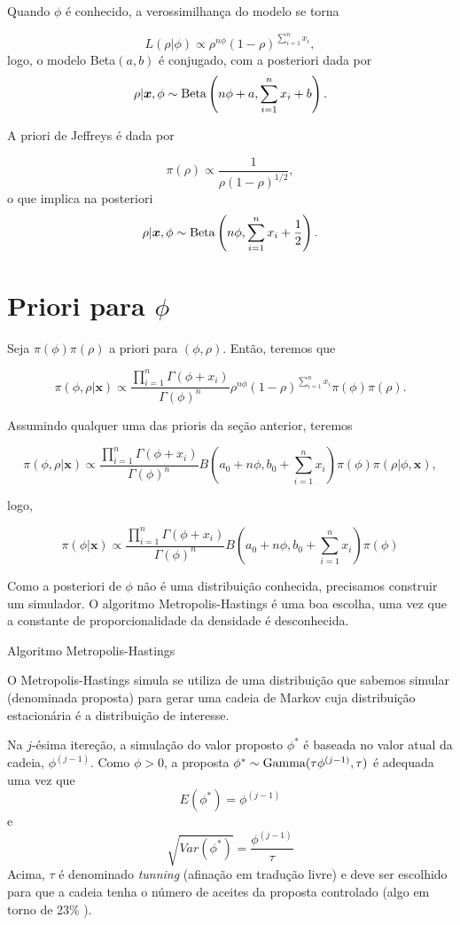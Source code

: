 \documentclass[
  letterpaper,
  DIV=11,
  numbers=noendperiod]{scrreprt}
\theoremstyle{plain}
\theoremstyle{definition}
\theoremstyle{definition}
\theoremstyle{remark}
\begin{document}
Quando \(\phi\) é conhecido, a verossimilhança do modelo se torna

\[L(\rho|\phi)\propto \rho^{n\phi}(1-\rho)^{\sum_{i=1}^n x_i},\] logo, o
modelo Beta\((a,b)\) é conjugado, com a posteriori dada por
\[\rho|\boldsymbol{x},\phi\sim\hbox{Beta}\left(n\phi+a,\sum_{i=1}^n x_i+b\right).\]

A priori de Jeffreys é dada por

\[\pi(\rho)\propto \frac{1}{\rho(1-\rho)^{1/2}},\] o que implica na
posteriori
\[\rho|\boldsymbol{x},\phi\sim\hbox{Beta}\left(n\phi,\sum_{i=1}^n x_i+\frac{1}{2}\right).\]

\section{\texorpdfstring{Priori para
\(\phi\)}{Priori para \textbackslash phi}}\label{priori-para-phi}

Seja \(\pi(\phi)\pi(\rho)\) a priori para \((\phi,\rho)\). Então,
teremos que

\[\pi(\phi,\rho|\boldsymbol{x})\propto \frac{\prod_{i=1}^n\Gamma(\phi+x_i)}{\Gamma(\phi)^n}\rho^{n\phi}(1-\rho)^{\sum_{i=1}^n x_i}\pi(\phi)\pi(\rho).\]

Assumindo qualquer uma das prioris da seção anterior, teremos

\[\pi(\phi,\rho|\boldsymbol{x})\propto \frac{\prod_{i=1}^n\Gamma(\phi+x_i)}{\Gamma(\phi)^n}B\left(a_0+n\phi,b_0+\sum_{i=1}^nx_i\right)\pi(\phi)\pi(\rho|\phi,\boldsymbol{x}),\]

logo,

\[\pi(\phi|\boldsymbol{x})\propto \frac{\prod_{i=1}^n\Gamma(\phi+x_i)}{\Gamma(\phi)^n}B\left(a_0+n\phi,b_0+\sum_{i=1}^nx_i\right)\pi(\phi)\]

Como a posteriori de \(\phi\) não é uma distribuição conhecida,
precisamos construir um simulador. O algoritmo Metropolis-Hastings é uma
boa escolha, uma vez que a constante de proporcionalidade da densidade é
desconhecida.

Algoritmo Metropolis-Hastings

O Metropolis-Hastings simula se utiliza de uma distribuição que sabemos
simular (denominada proposta) para gerar uma cadeia de Markov cuja
distribuição estacionária é a distribuição de interesse.

Na \(j\)-ésima itereção, a simulação do valor proposto \(\phi^*\) é
baseada no valor atual da cadeia, \(\phi^{(j-1)}\). Como \(\phi>0\), a
proposta \(\phi^*\sim \hbox{Gamma}(\tau\phi^{(j-1)},\tau)\) é adequada
uma vez que \[E(\phi^*)=\phi^{(j-1)}\] e
\[\sqrt{Var(\phi^*)}=\frac{\phi^{(j-1)}}{\tau}\] Acima, \(\tau\) é
denominado \emph{tunning} (afinação em tradução livre) e deve ser
escolhido para que a cadeia tenha o número de aceites da proposta
controlado (algo em torno de 23\% ).
\end{document}
